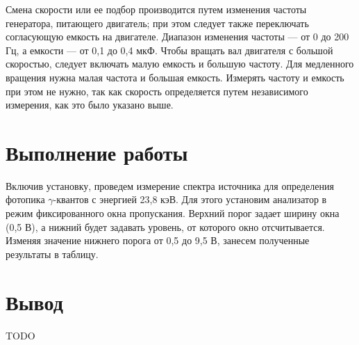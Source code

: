 \documentclass[12pt]{kiarticle}
\begin{document}
	Смена скорости или ее подбор производится путем изменения частоты генератора, питающего двигатель; при этом следует также переключать согласующую емкость на двигателе. Диапазон изменения
	частоты --- от 0 до 200 Гц, а емкости --- от 0,1 до 0,4 мкФ. Чтобы вращать вал двигателя с большой скоростью, следует включать малую
	емкость и большую частоту. Для медленного вращения нужна малая
	частота и большая емкость. Измерять частоту и емкость при этом не нужно, так как скорость определяется путем независимого измерения,
	как это было указано выше.

	
	\section{Выполнение работы}
	
	Включив установку, проведем измерение спектра источника для определения фотопика $ \gamma $-квантов с энергией 23,8 кэВ. Для этого установим анализатор в режим фиксированного окна пропускания. Верхний порог задает ширину окна (0,5 В), а нижний будет задавать уровень, от которого окно отсчитывается. Изменяя значение нижнего порога от 0,5 до 9,5 В, занесем полученные результаты в таблицу. 
	
	 
	
	\section{Вывод}
	
	TODO
	
\end{document}

